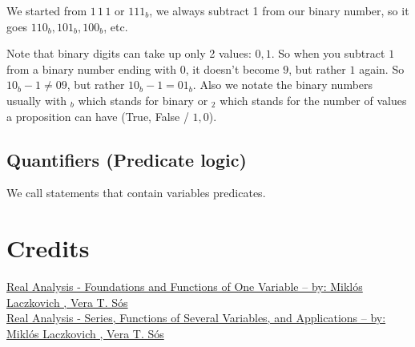 \documentclass{article}
\let\stdsection\section
\renewcommand\section{\newpage\stdsection}
\begin{document}
We started from $1\,1\,1$ or $111_{b}$, we always subtract 1 from our binary number, so it goes $110_{b}, 101_{b}, 100_{b}$, etc.

Note that binary digits can take up only 2 values: $0, 1$. So when you subtract $1$ from a binary number ending with $0$, it doesn't become $9$, but rather $1$ again. So $10_{b}-1 \neq 09$, but rather $10_{b}-1 = 01_{b}$. Also we notate the binary numbers usually with $_{b}$ which stands for binary or $_{2}$ which stands for the number of values a proposition can have (True, False / $1, 0$).

\newpage
\subsection{Quantifiers (Predicate logic)}

We call statements that contain variables predicates.


\section{Credits}

\href{https://link.springer.com/book/10.1007/978-1-4939-2766-1}{Real Analysis - Foundations and Functions of One Variable -- by: Miklós Laczkovich , Vera T. Sós}\\
\href{https://link.springer.com/book/10.1007/978-1-4939-7369-9}{Real Analysis - Series, Functions of Several Variables, and Applications -- by: Miklós Laczkovich , Vera T. Sós}
\end{document}
